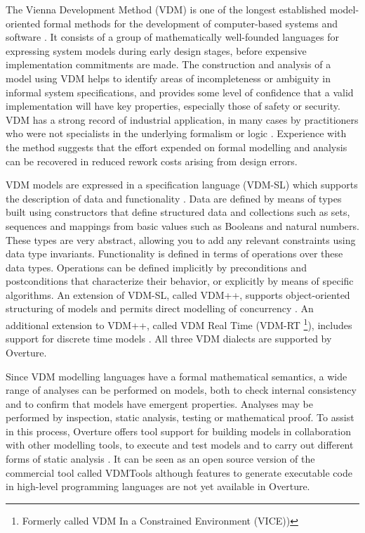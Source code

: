 \documentclass{overturerepchap}
\begin{document}
The Vienna Development Method (VDM) is one of the longest established
model-oriented formal methods for the development of computer-based
systems and software
\cite{Bjorner&78,Jones90a,Fitzgerald&08c}. It consists of a
group of mathematically well-founded languages for expressing system
models during early design stages, before expensive implementation
commitments are made. The construction and analysis of a model using
VDM helps to identify areas of incompleteness or ambiguity in
informal system specifications, and provides some level of confidence
that a valid implementation will have key properties, especially those
of safety or security. VDM has a strong record of industrial
application, in many cases by practitioners who were not specialists in
the underlying formalism or logic
\cite{Larsen&95b,Clement&99,Kurita&09}. Experience with the method
suggests that the effort expended on formal modelling and analysis can
be recovered in reduced rework costs arising from design errors.

VDM models are expressed in a specification language (VDM-SL) which
supports the description of data and functionality
\cite{ISOVDM96a,Fitzgerald&98b,Fitzgerald&09}. Data are defined by
means of types built using constructors that define structured data
and collections such as sets, sequences and mappings from basic values
such as Booleans and natural numbers. These types are very abstract,
allowing you to add any relevant constraints using data type
invariants. Functionality is defined in terms of operations over these
data types. Operations can be defined implicitly by preconditions and
postconditions that characterize their behavior, or explicitly by
means of specific algorithms. An extension of VDM-SL, called VDM++,
supports object-oriented structuring of models and permits direct
modelling of concurrency \cite{Fitzgerald&05}. An additional extension
to VDM++, called VDM Real Time (VDM-RT \footnote{Formerly called VDM In a
Constrained Environment (VICE))}), includes support for discrete
time models \cite{Mukherjee&00,Verhoef&06b}. All
three VDM dialects are supported by Overture.

Since VDM modelling languages have a formal mathematical semantics,
a wide range of analyses can be performed on models, both to check
internal consistency and to confirm that models have emergent
properties. Analyses may be performed by inspection, static analysis,
testing or mathematical proof. To assist in this process, Overture
offers tool support for building models in collaboration with other
modelling tools, to execute and test models and to carry out different
forms of static analysis \cite{Larsen&10a}. It can be seen as an open
source version of the commercial tool called VDMTools
\cite{Elmstrom&94,Larsen01,Fitzgerald&08a} although features to
generate executable code in high-level programming languages are
not yet available in Overture.
\end{document}
